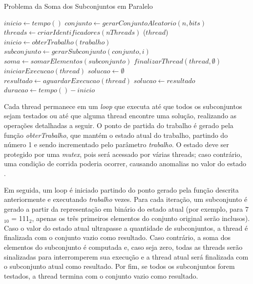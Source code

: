 \documentclass[12pt]{article}
\begin{document}
\begin{algorithm}[ht]
  \small
  \DontPrintSemicolon
  \caption{Problema da Soma dos Subconjuntos em Paralelo}
  \label{alg:exp}

  \BlankLine
  $inicio \leftarrow tempo()$ \;
  $conjunto \leftarrow gerarConjuntoAleatorio(n, bits)$ \;
  $threads \leftarrow criarIdentificadores(nThreads)$ \;
  \BlankLine
   {
    \Parallel($thread$){
         {
            $inicio \leftarrow obterTrabalho(trabalho)$ \;
             {
                $subconjunto \leftarrow gerarSubconjunto(conjunto, i)$ \;
                $soma \leftarrow somarElementos(subconjunto)$ \;
                \BlankLine
            }
        }
        \BlankLine
        $finalizarThread(thread, \emptyset)$ \;
    }
    \BlankLine
    $iniciarExecucao(thread)$ \;
  }
  \BlankLine
  $solucao \leftarrow \emptyset$ \;
  \BlankLine
   {
    $resultado \leftarrow aguardarExecucao(thread)$ \;
     {
        $solucao \leftarrow resultado$ \;
    }
  }
  \BlankLine
  $duracao \leftarrow tempo() - inicio$ \;
   \;
\end{algorithm}

Cada thread permanece em um \textit{loop} que executa até que todos os subconjuntos sejam testados ou até que alguma thread encontre uma solução, realizando as operações detalhadas a seguir. O ponto de partida do trabalho é gerado pela função \textit{obterTrabalho}, que mantém o estado atual do trabalho, partindo do número 1 e sendo incrementado pelo parâmetro \textit{trabalho}. O estado deve ser protegido por uma \textit{mutex}, pois será acessado por várias threads; caso contrário, uma condição de corrida poderia ocorrer, causando anomalias no valor do estado \cite{Lewis1996}.

Em seguida, um loop é iniciado partindo do ponto gerado pela função descrita anteriormente e executando \textit{trabalho} vezes. Para cada iteração, um subconjunto é gerado a partir da representação em binário do estado atual (por exemplo, para 7$_{10}$ = 111$_{2}$, apenas os três primeiros elementos do conjunto original serão inclusos). Caso o valor do estado atual ultrapasse a quantidade de subconjuntos, a thread é finalizada com o conjunto vazio como resultado. Caso contrário, a soma dos elementos do subconjunto é computada e, caso seja zero, todas as threads serão sinalizadas para interromperem sua execução e a thread atual será finalizada com o subconjunto atual como resultado. Por fim, se todos os subconjuntos forem testados, a thread termina com o conjunto vazio como resultado.
\end{document}
